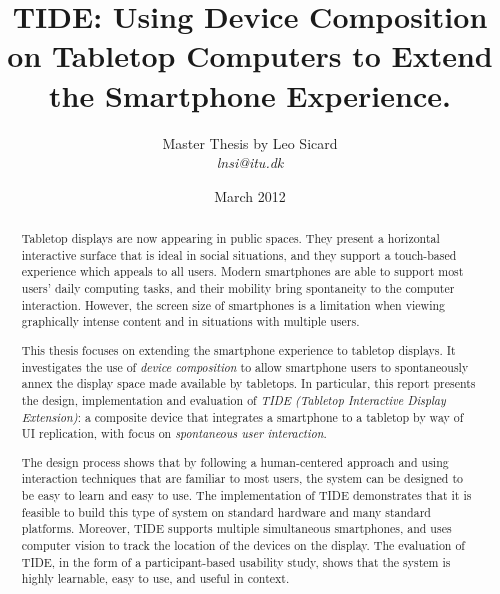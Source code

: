 \documentclass[a4paper,11pt,twoside,onecolumn,openright]{memoir}
\title{TIDE: Using Device Composition on Tabletop Computers to Extend the Smartphone Experience.
}
\author{Master Thesis by Leo Sicard\\\emph{lnsi@itu.dk}}
\date{March 2012}
\begin{document}
%
%
\maketitle
\clearpage



\begin{abstract}
Tabletop displays are now appearing in public spaces.
They present a horizontal interactive surface that is ideal in social situations, and they support a touch-based experience which appeals to all users.
Modern smartphones are able to support most users' daily computing tasks, and their mobility bring spontaneity to the computer interaction.
However, the screen size of smartphones is a limitation when viewing graphically intense content and in situations with multiple users.

This thesis focuses on extending the smartphone experience to tabletop displays.
It investigates the use of \emph{device composition} to allow smartphone users to spontaneously annex the display space made available by tabletops.
In particular, this report presents the design, implementation and evaluation of \emph{TIDE (Tabletop Interactive Display Extension)}: a composite device that integrates a smartphone to a tabletop by way of UI replication, with focus on \emph{spontaneous user interaction}.

The design process shows that by following a human-centered approach and using interaction techniques that are familiar to most users, the system can be designed to be easy to learn and easy to use.
The implementation of TIDE demonstrates that it is feasible to build this type of system on standard hardware and many standard platforms.
Moreover, TIDE supports multiple simultaneous smartphones, and uses computer vision to track the location of the devices on the display.
The evaluation of TIDE, in the form of a participant-based usability study, shows that the system is highly learnable, easy to use, and useful in context.


\end{abstract}

\clearpage

%

\renewcommand{\abstractname}{Acknowledgements}
\end{document}
